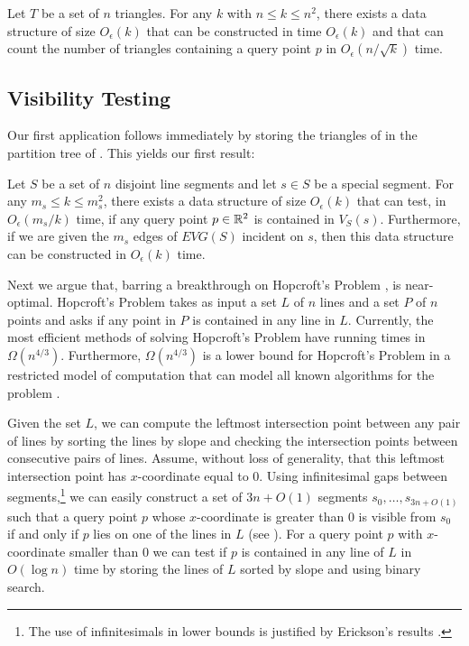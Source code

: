 \documentclass{patmorin}
\newcommand{\EVG}{\mathit{EVG}}
\newcommand{\Oe}{O_\epsilon}
\begin{document}
\begin{thm}
Let $T$ be a set of $n$ triangles. For any $k$ with $n\le k\le n^2$, there
exists a data structure of size $\Oe(k)$ that can be constructed in time
$\Oe(k)$ and that can count the number of triangles containing a query
point $p$ in $\Oe(n/\sqrt{k})$ time.
\end{thm}


\subsection{Visibility Testing}

Our first application follows immediately by storing the triangles of
 in the partition tree of .  This
yields our first result:

\begin{thm}
Let $S$ be a set of $n$ disjoint line segments and let $s\in S$
be a special segment.  For any $m_s\le k\le m_s^2$, there exists a
data structure of size $\Oe(k)$ that can test, in $\Oe(m_s/k)$ time,
if any query point $p\in\mathbb{R}^2$ is contained in $V_S(s)$.  Furthermore,
if we are given the $m_s$ edges of $\EVG(S)$ incident on $s$, then this
data structure can be constructed in $\Oe(k)$ time.
\end{thm}

Next we argue that, barring a breakthrough on Hopcroft's Problem
\cite{hXX},  is near-optimal.  Hopcroft's Problem takes
as input a set $L$ of $n$ lines and a set $P$ of $n$ points and asks if any
point in $P$ is contained in any line in $L$. Currently, the most efficient
methods of solving Hopcroft's Problem have running times in
$\Omega(n^{4/3})$.  Furthermore, $\Omega(n^{4/3})$ is a lower bound for
Hopcroft's Problem in a restricted model of computation that can model all
known algorithms for the problem \cite{eXX}. 

Given the set $L$, we can compute the leftmost intersection point between
any pair of lines by sorting the lines by slope and checking the
intersection points between consecutive pairs of lines.  Assume, without
loss of generality, that this leftmost intersection point has
$x$-coordinate equal to 0. Using infinitesimal gaps between
segments,\footnote{The use of infinitesimals in lower bounds is justified
by Erickson's results \cite{X}.} we can easily construct a set of $3n+O(1)$
segments $s_0,\ldots,s_{3n+O(1)}$ such that a query point $p$ whose
$x$-coordinate is greater than 0 is visible from $s_0$ if and only if $p$
lies on one of the lines in $L$ (see ).  For a query point
$p$ with $x$-coordinate smaller than 0 we can test if $p$ is contained in
any line of $L$ in $O(\log n)$ time by storing the lines of $L$ sorted by
slope and using binary search.
\end{document}
